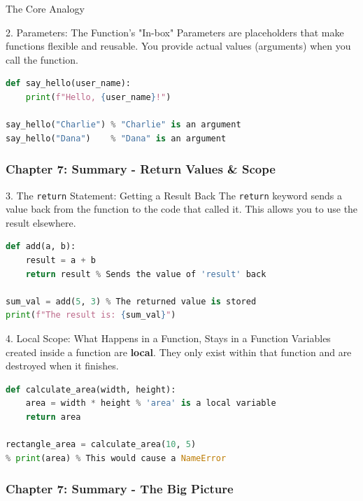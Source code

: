 \documentclass{beamer}
\begin{document}
\begin{frame}[fragile]
\begin{block}{The Core Analogy}
\begin{frame}[fragile]
    \begin{block}{2. Parameters: The Function's "In-box"}
        Parameters are placeholders that make functions flexible and reusable. You provide actual values (arguments) when you call the function.
        \begin{lstlisting}[language=Python]
% 'user_name' is a parameter (placeholder)
def say_hello(user_name):
    print(f"Hello, {user_name}!")

say_hello("Charlie") % "Charlie" is an argument
say_hello("Dana")    % "Dana" is an argument
        \end{lstlisting}
    \end{block}
    
\end{frame}

\begin{frame}[fragile]
    \frametitle{Chapter 7: Summary - Return Values \& Scope}
    
    \begin{block}{3. The \texttt{return} Statement: Getting a Result Back}
        The \texttt{return} keyword sends a value back from the function to the code that called it. This allows you to use the result elsewhere.
        \begin{lstlisting}[language=Python]
def add(a, b):
    result = a + b
    return result % Sends the value of 'result' back

sum_val = add(5, 3) % The returned value is stored
print(f"The result is: {sum_val}")
        \end{lstlisting}
    \end{block}
    
    \begin{block}{4. Local Scope: What Happens in a Function, Stays in a Function}
        Variables created inside a function are \textbf{local}. They only exist within that function and are destroyed when it finishes.
        \begin{lstlisting}[language=Python]
def calculate_area(width, height):
    area = width * height % 'area' is a local variable
    return area

rectangle_area = calculate_area(10, 5)
% print(area) % This would cause a NameError
        \end{lstlisting}
    \end{block}
\end{frame}

\begin{frame}[fragile]
    \frametitle{Chapter 7: Summary - The Big Picture}
    

\end{frame}
\end{block}
\end{frame}
\end{document}
